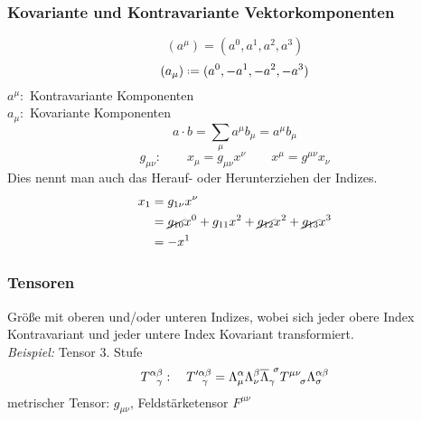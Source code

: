 \subsubsection{Kovariante und Kontravariante Vektorkomponenten}

\begin{equation*}
(a^{\mu}) = (a^0, a^1, a^2, a^3)
\end{equation*}
\begin{equation*}
(a_{\mu}) \defeq (a^0, -a^1, -a^2, -a^3)
\end{equation*}
$ a^{\mu} : $ Kontravariante Komponenten\\
$ a_{\mu} : $ Kovariante Komponenten
\begin{equation*}
a \cdot b = \sum_{\mu} a^{\mu} b_{\mu} = a^{\mu} b_{\mu}
\end{equation*}
$$ g_{\mu \nu} : \qquad x_{\mu} = g_{\mu \nu} x^{\nu} \qquad x^{\mu} = g^{\mu \nu} x_{\nu} $$
Dies nennt man auch das Herauf- oder Herunterziehen der Indizes.
\begin{align*}
x_1 &= g_{1 \nu} x^\nu\\
&= \cancel{g_{10}}x^0 + g_{11} x^2 + \cancel{g_{12}}x^2 + \cancel{g_{13}}x^3\\
&= - x^1
\end{align*}

\subsubsection{Tensoren}

Größe mit oberen und/oder unteren Indizes, wobei sich jeder obere Index Kontravariant und jeder untere Index Kovariant transformiert.\\[5pt]
\emph{Beispiel:} Tensor 3. Stufe
$$ T^{\alpha \beta}_{\ \ \gamma} : \quad T'^{\alpha \beta}_{\ \ \gamma} = \Lambda^{\alpha}_{\mu} \Lambda^{\beta}_{\nu} \overline{\Lambda}_{\gamma} ^{\ \sigma} T^{\mu \nu}_{\ \ \ \sigma} \Lambda^{\alpha \beta}  _{\sigma} $$
metrischer Tensor: $ g_{\mu \nu} $, Feldstärketensor $ F^{\mu \nu} $
